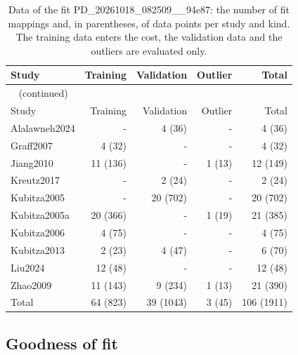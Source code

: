 \documentclass{article}
\begin{document}
\begin{longtable}{lrrrr}
\caption{Data of the fit PD\_20261018\_082509\_\_94e87: the number of fit mappings and, in parentheses, of data points per study and kind. The training data enters the cost, the validation data and the outliers are evaluated only.}\label{tab:data:PD_20261018_082509__94e87} \\
\toprule
Study & Training & Validation & Outlier & Total \\
\midrule
\endfirsthead
\multicolumn{5}{l}{\small\tablename~\thetable{} (continued)} \\
\toprule
Study & Training & Validation & Outlier & Total \\
\midrule
\endhead
\bottomrule
\endlastfoot
Alalawneh2024 & - & 4 (36) & - & 4 (36) \\
Graff2007 & 4 (32) & - & - & 4 (32) \\
Jiang2010 & 11 (136) & - & 1 (13) & 12 (149) \\
Kreutz2017 & - & 2 (24) & - & 2 (24) \\
Kubitza2005 & - & 20 (702) & - & 20 (702) \\
Kubitza2005a & 20 (366) & - & 1 (19) & 21 (385) \\
Kubitza2006 & 4 (75) & - & - & 4 (75) \\
Kubitza2013 & 2 (23) & 4 (47) & - & 6 (70) \\
Liu2024 & 12 (48) & - & - & 12 (48) \\
Zhao2009 & 11 (143) & 9 (234) & 1 (13) & 21 (390) \\
Total & 64 (823) & 39 (1043) & 3 (45) & 106 (1911) \\
\end{longtable}

\subsection{Goodness of fit}
\end{document}
